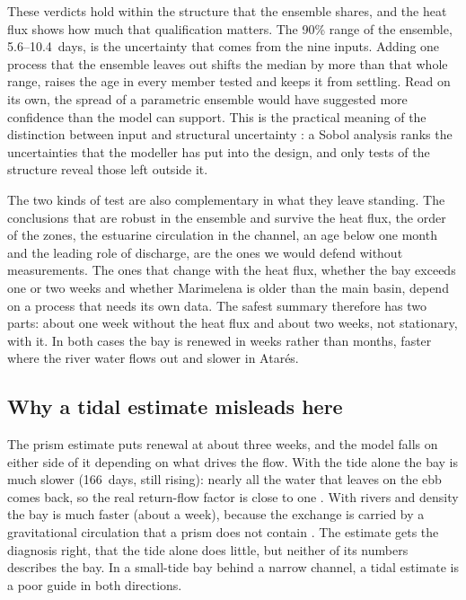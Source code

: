\documentclass[a4paper,fleqn]{ems-dc}
\begin{document}
These verdicts hold within the structure that the ensemble shares, and the heat flux shows
how much that qualification matters. The 90\% range of the ensemble, 5.6--10.4~days, is the
uncertainty that comes from the nine inputs. Adding one process that the ensemble leaves
out shifts the median by more than that whole range, raises the age in every member tested
and keeps it from settling. Read on its own, the spread of a parametric ensemble would have
suggested more confidence than the model can support. This is the practical meaning of the
distinction between input and structural uncertainty
\citep{Walker2003,Refsgaard2006,Gupta2012}: a Sobol analysis ranks the uncertainties that the
modeller has put into the design, and only tests of the structure reveal those left outside
it.

The two kinds of test are also complementary in what they leave standing. The conclusions
that are robust in the ensemble and survive the heat flux, the order of the zones, the
estuarine circulation in the channel, an age below one month and the leading role of
discharge, are the ones we would defend without measurements. The ones that change with the
heat flux, whether the bay exceeds one or two weeks and whether Marimelena is older than
the main basin, depend on a process that needs its own data. The safest summary therefore
has two parts: about one week without the heat flux and about two weeks, not stationary, with
it. In both cases the bay is renewed in weeks rather than months, faster where the river
water flows out and slower in Atar\'es.

\subsection{Why a tidal estimate misleads here}
The prism estimate puts renewal at about three weeks, and the model falls on either side of
it depending on what drives the flow. With the tide alone the bay is much slower (166~days,
still rising): nearly all the water that leaves on the ebb comes back, so the real
return-flow factor is close to one \citep{Sanford1992}. With rivers and density the bay is
much faster (about a week), because the exchange is carried by a gravitational circulation
that a prism does not contain \citep{MacCready2010}. The estimate gets the diagnosis right,
that the tide alone does little, but neither of its numbers describes the bay. In a
small-tide bay behind a narrow channel, a tidal estimate is a poor guide in both directions.
\end{document}
